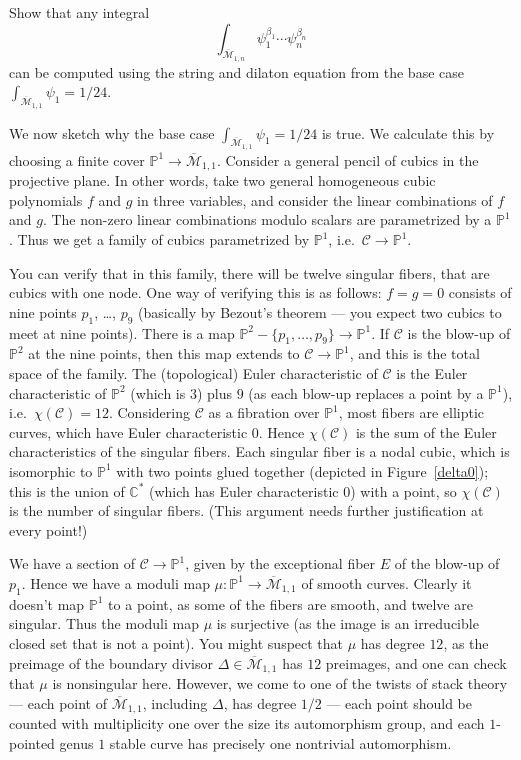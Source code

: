 \documentclass[12pt,letterpaper]{amsart}
\newcommand{\C}{\mathbb{C}}
\newcommand{\proj}{\mathbb P}
\newcommand{\cC}{{\mathcal{C}}}
\newcommand{\cm}{{\mathcal{M}}}
\newcommand{\cmbar}{\overline{\cm}}
\newcommand{\be}{\beta}
\newcommand{\De}{\Delta}
\begin{document}
{  Show that any integral
$$
\int_{\cmbar_{1,n}} \psi_1^{\be_1} \cdots \psi_n^{\be_n}$$ can be
computed using the string and dilaton equation from the base case
$\int_{\cmbar_{1,1}} \psi_1 = 1/24$.

We now sketch why the base case $\int_{\cmbar_{1,1}} \psi_1 = 1/24$ is
true.  We calculate this by choosing a finite cover $\proj^1
\rightarrow \cmbar_{1,1}$.  Consider a general pencil of cubics in the
projective plane.  In other words, take two general homogeneous cubic polynomials
$f$ and $g$ in three variables, and consider the linear combinations
of $f$ and $g$.  The non-zero  linear combinations modulo scalars are
parametrized by a $\proj^1$.  Thus we get a family of cubics parametrized
by 
$\proj^1$, i.e.\ $\cC \rightarrow \proj^1$.  

You can verify that in
this family, there will be twelve singular fibers, that are cubics
with one node.  One way of verifying this is as follows:  $f=g=0$
consists of nine points $p_1$, \dots, $p_9$ (basically by Bezout's
theorem --- you expect two cubics to meet at nine points).  There is a
map $\proj^2 - \{ p_1, \dots, p_9 \} \rightarrow \proj^1$.  If $\cC$
is the blow-up of $\proj^2$ at the nine points, then this map extends
to $\cC \rightarrow \proj^1$, and this is the total space of the
family.
The (topological) Euler characteristic of $\cC$ is the Euler
characteristic of $\proj^2$ (which is $3$) plus $9$ (as each blow-up
replaces a point by a $\proj^1$), i.e.\ $\chi(\cC) = 12$.  Considering
$\cC$ as a fibration over $\proj^1$, most fibers are elliptic curves,
which have Euler characteristic $0$.  Hence $\chi(\cC)$ is the sum of
the Euler characteristics of the singular fibers.  Each singular fiber
is a nodal cubic, which is isomorphic to $\proj^1$ with two points
glued together (depicted in Figure~\ref{delta0}); this is the union of $\C^*$ (which has Euler
characteristic $0$) with a point, so $\chi(\cC)$ is the number of
singular fibers.  (This argument needs further justification at every
point!)

We have a section of $\cC \rightarrow \proj^1$, given by the
exceptional fiber $E$ of the blow-up of $p_1$.  Hence we have a moduli map
$\mu: \proj^1 \rightarrow \cmbar_{1,1}$ of smooth curves.  Clearly it
doesn't map $\proj^1$ to a point, as some of the fibers are smooth,
and twelve are singular.  Thus the moduli map $\mu$ is surjective (as the image
is an irreducible closed set that is not a point).
You might suspect that $\mu$ has degree $12$, as the preimage of the
boundary divisor $\De \in \cmbar_{1,1}$ has $12$ preimages, and one
can check that $\mu$ is nonsingular here.  However, we come to one of
the twists of stack theory --- each point of $\cmbar_{1,1}$, including
$\De$, has degree $1/2$ --- each point should be counted with
multiplicity one over the size its automorphism group, and each
$1$-pointed genus $1$ stable curve has precisely one nontrivial
automorphism.

}
\end{document}
